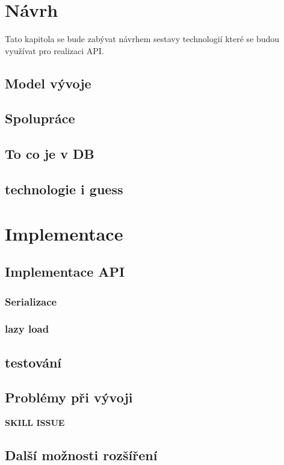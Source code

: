 \chapter{Návrh}
Tato kapitola se bude zabývat návrhem sestavy technologií které se budou využívat pro realizaci API.

\section{Model vývoje}

\section{Spolupráce}

\section{To co je v DB}

\section{technologie i guess}


\chapter{Implementace}

\section{Implementace API}

\subsection{Serializace}
\subsection{lazy load}
\section{testování}

\section{Problémy při vývoji}
\textbf{SKILL ISSUE}
\section{Další možnosti rozšíření}